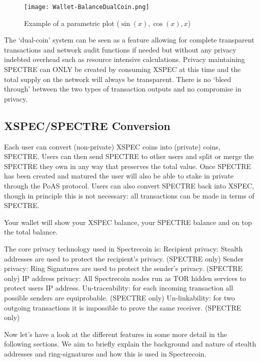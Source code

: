 \begin{figure}[h]
	\caption{Example of a parametric plot ($\sin (x), \cos(x), x$)}
	\centering
	\texttt{[image: Wallet-BalanceDualCoin.png]}
\end{figure}



The ‘dual-coin’ system can be seen as a feature allowing for complete
transparent transactions and network audit functions if needed but
without any privacy indebted overhead such as resource intensive
calculations. Privacy maintaining SPECTRE can ONLY be created by
consuming XSPEC at this time and the total supply on the network
will always be transparent. There is no ‘bleed through’ between the
two types of transaction outputs and no compromise in privacy.



\subsection{XSPEC/SPECTRE Conversion}
Each user can convert (non-private) XSPEC coins into (private) coins, SPECTRE.
Users can then send SPECTRE to other users and split or merge the SPECTRE they
own in any way that preserves the total value. Once SPECTRE has been created
and matured the user will also be able to stake in private through the PoAS
protocol. Users can also convert SPECTRE back into XSPEC, though in principle
this is not necessary: all transactions can be made in terms of SPECTRE.



Your wallet will show your XSPEC balance, your SPECTRE balance and on top the
total balance.



The core privacy technology used in Spectrecoin is: Recipient privacy: Stealth
addresses are used to protect the recipient’s privacy. (SPECTRE only) Sender
privacy: Ring Signatures are used to protect the sender’s privacy. (SPECTRE
only) IP address privacy: All Spectrecoin nodes run as TOR hidden services to
protect users IP address. Un-traceability: for each incoming transaction all
possible senders are equiprobable. (SPECTRE only) Un-linkability: for two
outgoing transactions it is impossible to prove the same receiver. (SPECTRE
only)



Now let’s have a look at the different features in some more detail in the
following sections. We aim to briefly explain the background and nature of
stealth addresses and ring-signatures and how this is used in Spectrecoin.
